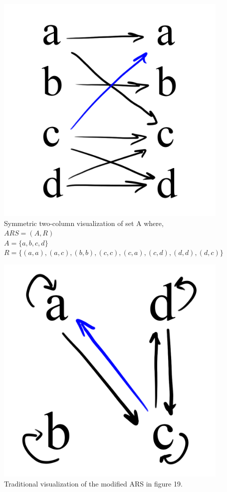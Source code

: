\documentclass{article}
\begin{document}
\begin{figure}[H]
  \centering
  \includegraphics[scale=0.06]{s3}
  \caption[] {
    Symmetric two-column visualization of set A where,
    \\ $ARS = (A, R)$
    \\ $A = \{a, b, c ,d\}$
    \\ $R = \{(a, a), (a, c), (b, b), (c, c), (c, a), (c, d), (d, d), (d, c)\}$
    \endtabular}
\end{figure}

\begin{figure}[H]
  \centering
  \includegraphics[scale=0.06]{v2}
  \caption[] {
    Traditional visualization of the modified ARS in figure 19.
    \endtabular}
\end{figure}
    
\end{document}
